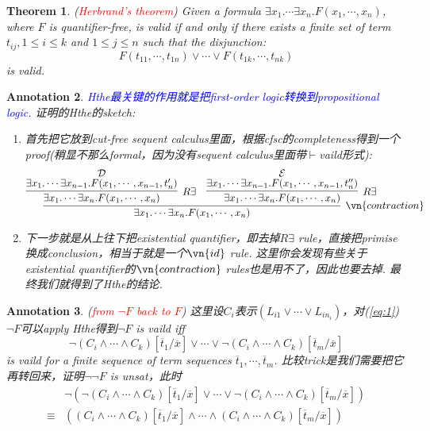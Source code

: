 \documentclass{article}
\theoremstyle{plain}
\newtheorem{theorem}{Theorem}
\newtheorem{annotation}[theorem]{Annotation}
\theoremstyle{nonumberplain}
\newcommand{\redt}[1]{\textcolor{red}{#1}}
\newcommand{\bluet}[1]{\textcolor{blue}{#1}}
\begin{document}
\begin{theorem}
\rm (\redt{Herbrand's theorem}) Given a formula $\exists x_1. \cdots \exists x_n. F(x_1,\cdots,x_n)$, where $F$ is quantifier-free, is valid if and only if there exists a finite set of term $t_{ij}, 1 \leq i \leq k$ and $1 \leq j \leq n$ such that the disjunction:
\[
F(t_{11},\cdots,t_{1n}) \vee \cdots \vee F(t_{1k},\cdots,t_{nk})
\]
is valid. 
\end{theorem}

\begin{annotation}
\rm \bluet{Hthe最关键的作用就是把first-order logic转换到propositional logic}. 证明的Hthe的sketch:
\begin{enumerate}
	\item 首先把它放到cut-free sequent calculus里面，根据cfsc的completeness得到一个proof(稍显不那么formal，因为没有sequent calculus里面带$\vdash$vaild形式):
	\[
	\infer[\vn{contraction}]{ \exists x_1. \cdots \exists x_n. F(x_1,		\cdots,x_n)}{\infer[R \exists]{\exists x_1. \cdots \exists x_n. F(x_1,	\cdots,x_n)}{\deduce{\exists x_1. \cdots \exists x_{n-1}. F(x_1,\cdots,x_{n-1},t_n')}{\mathcal{D}}} & \infer[R \exists]{\exists x_1. \cdots \exists x_n. F(x_1,\cdots,x_n)}{\deduce{\exists x_1. \cdots \exists x_{n-1}. F(x_1,\cdots,x_{n-1},t_n'')}{\mathcal{E}}}}
	\]
	\item 下一步就是从上往下把existential quantifier，即去掉$R \exists$ rule，直接把primise换成conclusion，相当于就是一个$\vn{id}$ rule. 这里你会发现有些关于existential quantifier的$\vn{contraction}$ rules也是用不了，因此也要去掉. 最终我们就得到了Hthe的结论. 
\end{enumerate} 
\end{annotation}


\begin{annotation}
\rm (\redt{from $\neg F$ back to $F$}) 这里设$C_i$表示$(L_{i1} \vee \cdots \vee L_{in_i})$，对(\ref{eq:1}) $\neg F$可以apply Hthe得到$\neg F$ is vaild iff 
\[
\neg(C_i \wedge \cdots \wedge C_k)[\overline{t}_1/\overline{x}] \vee \cdots \vee \neg(C_i \wedge \cdots \wedge C_k)[\overline{t}_m/\overline{x}]
\]
is vaild for a finite sequence of term sequences $\overline{t}_1,\cdots,\overline{t}_m$. 比较trick是我们需要把它再转回来，证明$\neg \neg F$ is unsat，此时
\begin{equation}
\begin{aligned}
&\neg\left(\neg(C_i \wedge \cdots \wedge C_k)[\overline{t}_1/\overline{x}] \vee \cdots \vee \neg(C_i \wedge \cdots \wedge C_k)[\overline{t}_m/\overline{x}]\right) \\
\equiv & \left((C_i \wedge \cdots \wedge C_k)[\overline{t}_1/\overline{x}] \wedge \cdots \wedge (C_i \wedge \cdots \wedge C_k)[\overline{t}_m/\overline{x}]\right)
\end{aligned}
\end{equation}
\end{annotation}
\end{document}
